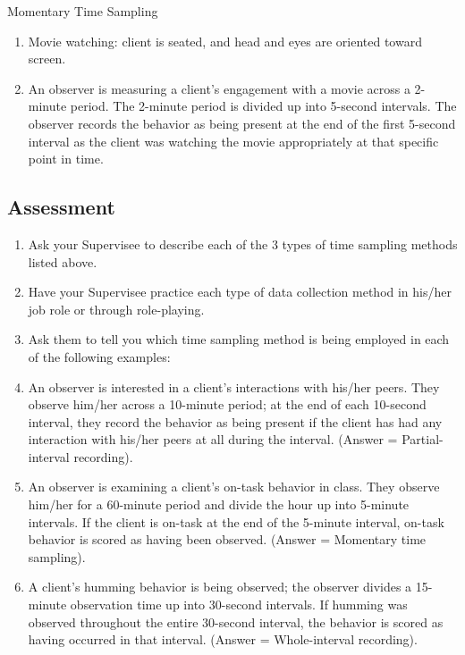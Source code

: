 Momentary Time Sampling\\
\begin{enumerate}
\item Movie watching: client is seated, and head and eyes are oriented toward screen.
\item An observer is measuring a client's engagement with a movie across a 2-minute period. The 2-minute period is divided up into 5-second intervals. The observer records the behavior as being present at the end of the first 5-second interval as the client was watching the movie appropriately at that specific point in time. 
\end{enumerate}
%
\subsection{Assessment}
\begin{enumerate}
\item Ask your Supervisee to describe each of the 3 types of time sampling methods listed above.
\item Have your Supervisee practice each type of data collection method in his/her job role or through role-playing.
\item Ask them to tell you which time sampling method is being employed in each of the following examples:
\item An observer is interested in a client's interactions with his/her peers. They observe him/her across a 10-minute period; at the end of each 10-second interval, they record the behavior as being present if the client has had any interaction with his/her peers at all during the interval. (Answer = Partial-interval recording).
\item An observer is examining a client's on-task behavior in class. They observe him/her for a 60-minute period and divide the hour up into 5-minute intervals. If the client is on-task at the end of the 5-minute interval, on-task behavior is scored as having been observed. (Answer = Momentary time sampling). 
\item A client's humming behavior is being observed; the observer divides a 15-minute observation time up into 30-second intervals. If humming was observed throughout the entire 30-second interval, the behavior is scored as having occurred in that interval. (Answer = Whole-interval recording). 
\end{enumerate}
%
